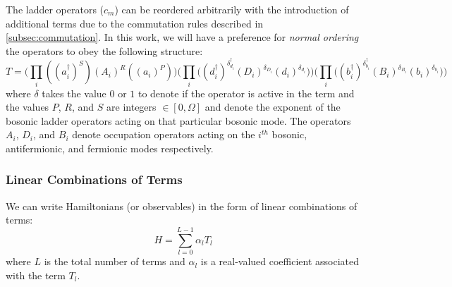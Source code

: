 The ladder operators ($c_m$) can be reordered arbitrarily with the introduction of additional terms due to the commutation rules described in \ref{subsec:commutation}.
In this work, we will have a preference for \textit{normal ordering}  the operators to obey the following structure:
\begin{equation}
    T = \Big( \prod_i ((a_i^\dagger)^S)(A_i)^R((a_i)^P) \Big) \Big( \prod_i \big( (d_i^\dagger)^{\delta_{d_i}^{\dagger}} (D_i)^{\delta_{D_i}} (d_i)^{\delta_{d_i}} \big) \Big) \Big( \prod_i \big( (b_i^\dagger)^{\delta_{b_i}^{\dagger}} (B_i)^{\delta_{B_i}} (b_i)^{\delta_{b_i}} \big) \Big) 
\end{equation}
where $\delta$ takes the value $0$ or $1$ to denote if the operator is active in the term and the values $P$, $R$, and $S$ are integers $\in [0, \Omega]$ and denote the exponent of the bosonic ladder operators acting on that particular bosonic mode.
The operators $A_i$, $D_i$, and $B_i$ denote occupation operators acting on the $i^{th}$ bosonic, antifermionic, and fermionic modes respectively.


\subsubsection{Linear Combinations of Terms}

We can write Hamiltonians (or observables) in the form of linear combinations of terms:
\begin{equation}
    \label{eq:lclo}
    H = \sum_{l=0}^{L-1} \alpha_l T_l
\end{equation}
where $L$ is the total number of terms and $\alpha_l$ is a real-valued coefficient associated with the term $T_l$.